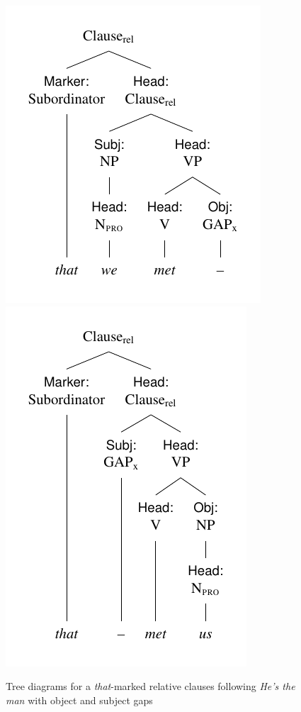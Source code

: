 \begin{figure}[ht]
    \includegraphics{figures/that-we-met.pdf}
    \includegraphics{figures/that-met-us.pdf}
    \caption{Tree diagrams for a \textit{that}-marked relative clauses following \textit{He's the man} with object and subject gaps}
    \label{fig:that-met-us}
\end{figure}

